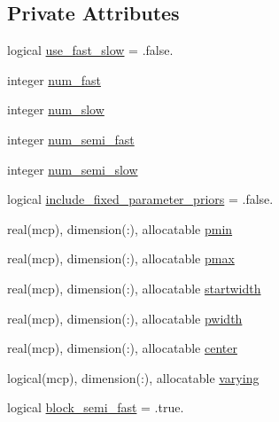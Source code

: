 \subsection*{Private Attributes}
\begin{DoxyCompactItemize}
\item 
logical \mbox{\hyperlink{structbaseparameters_1_1tbaseparameters_a03edbb9eb12946b364f24c9fde359887}{use\+\_\+fast\+\_\+slow}} = .false.
\item 
integer \mbox{\hyperlink{structbaseparameters_1_1tbaseparameters_aea569b0790a0fd47f415137eb410b3ab}{num\+\_\+fast}}
\item 
integer \mbox{\hyperlink{structbaseparameters_1_1tbaseparameters_a9fa87897d0b371baa9cf954626b93512}{num\+\_\+slow}}
\item 
integer \mbox{\hyperlink{structbaseparameters_1_1tbaseparameters_a2eadbaa69916bc50f9f8cd8fae949f5b}{num\+\_\+semi\+\_\+fast}}
\item 
integer \mbox{\hyperlink{structbaseparameters_1_1tbaseparameters_a48b3e7585ff14e04e4ca3f5ce4fe7653}{num\+\_\+semi\+\_\+slow}}
\item 
logical \mbox{\hyperlink{structbaseparameters_1_1tbaseparameters_a7d16842a3fc0856b9159e0717061c840}{include\+\_\+fixed\+\_\+parameter\+\_\+priors}} = .false.
\item 
real(mcp), dimension(\+:), allocatable \mbox{\hyperlink{structbaseparameters_1_1tbaseparameters_a46311af23307d56932eb5c536083f01e}{pmin}}
\item 
real(mcp), dimension(\+:), allocatable \mbox{\hyperlink{structbaseparameters_1_1tbaseparameters_a0cb6100175169243a0f630ff21d41d0d}{pmax}}
\item 
real(mcp), dimension(\+:), allocatable \mbox{\hyperlink{structbaseparameters_1_1tbaseparameters_a94fed3ee3d5afa99ea4567605cec4184}{startwidth}}
\item 
real(mcp), dimension(\+:), allocatable \mbox{\hyperlink{structbaseparameters_1_1tbaseparameters_affb888977c879d2e14ddac4b0e1effce}{pwidth}}
\item 
real(mcp), dimension(\+:), allocatable \mbox{\hyperlink{structbaseparameters_1_1tbaseparameters_a4fb55a55646ccf89b8434eb96a55482c}{center}}
\item 
logical(mcp), dimension(\+:), allocatable \mbox{\hyperlink{structbaseparameters_1_1tbaseparameters_aadeb3ac71c7a8996a127785d5f127543}{varying}}
\item 
logical \mbox{\hyperlink{structbaseparameters_1_1tbaseparameters_a6f68ade3ffd95c20f2922650698e9e5b}{block\+\_\+semi\+\_\+fast}} = .true.

\end{DoxyCompactItemize}
